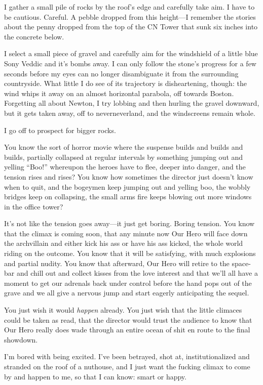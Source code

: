 I gather a small pile of rocks by the roof’s edge and carefully
take aim. I have to be cautious. Careful. A pebble dropped from
this height—I remember the stories about the penny dropped from the
top of the CN Tower that sunk six inches into the concrete below.

I select a small piece of gravel and carefully aim for the
windshield of a little blue Sony Veddic and it’s bombs away. I can
only follow the stone’s progress for a few seconds before my eyes
can no longer disambiguate it from the surrounding countryside.
What little I do see of its trajectory is disheartening, though:
the wind whips it away on an almost horizontal parabola, off
towards Boston. Forgetting all about Newton, I try lobbing and then
hurling the gravel downward, but it gets taken away, off to
neverneverland, and the windscreens remain whole.

I go off to prospect for bigger rocks.

You know the sort of horror movie where the suspense builds and
builds and builds, partially collapsed at regular intervals by
something jumping out and yelling “Boo!” whereupon the heroes have
to flee, deeper into danger, and the tension rises and rises? You
know how sometimes the director just doesn’t know when to quit, and
the bogeymen keep jumping out and yelling boo, the wobbly bridges
keep on collapsing, the small arms fire keeps blowing out more
windows in the office tower?

It’s not like the tension goes away—it just get boring. Boring
tension. You know that the climax is coming soon, that any minute
now Our Hero will face down the archvillain and either kick his ass
or have his ass kicked, the whole world riding on the outcome. You
know that it will be satisfying, with much explosions and partial
nudity. You know that afterward, Our Hero will retire to the
space-bar and chill out and collect kisses from the love interest
and that we’ll all have a moment to get our adrenals back under
control before the hand pops out of the grave and we all give a
nervous jump and start eagerly anticipating the sequel.

You just wish it would \emph{happen} already. You just wish that
the little climaces could be taken as read, that the director would
trust the audience to know that Our Hero really does wade through
an entire ocean of shit en route to the final showdown.

I’m bored with being excited. I’ve been betrayed, shot at,
institutionalized and stranded on the roof of a nuthouse, and I
just want the fucking climax to come by and happen to me, so that I
can know: smart or happy.

